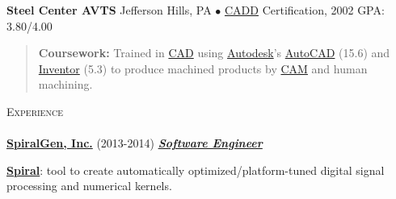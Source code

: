 \documentclass{article}
\newcommand{\area}[2]{\vspace*{-9pt} \begin{verse}\textbf{#1}   #2 \end{verse}  }
\newcommand{\lineunder}{\vspace*{-8pt} \\ \hspace*{-18pt} \hrulefill \\}
\newcommand{\header}[1]{{\hspace*{-15pt}\vspace*{6pt} \textsc{#1}} \vspace*{-6pt} \lineunder}
\newcommand{\employer}[3]{{ \textbf{#1} (#2) \underline{\textbf{\emph{#3}}}\\  }}
\newcommand{\schoolwithcourses}[3]{
 \textbf{#1} #2 $\bullet$ #3\\ 
\vspace*{5pt}
}
\begin{document}
\schoolwithcourses{Steel Center AVTS}{Jefferson Hills, PA}{\href{http://en.wikipedia.org/wiki/Computer-aided_design}{CADD} Certification, 2002 GPA: 3.80/4.00}
\area{
Coursework: }
{Trained in \href{http://en.wikipedia.org/wiki/Computer-aided_design}{CAD} using \href{http://www.autodesk.com/}{Autodesk}'s \href{http://www.autodesk.com/products/autocad/overview}{AutoCAD} (15.6) and \href{http://www.autodesk.com/products/autodesk-inventor-family/overview}{Inventor} (5.3) 
to produce machined products by \href{http://en.wikipedia.org/wiki/Computer-aided_manufacturing}{CAM} and human machining.  }

\header{Experience}

\employer{\href{http://spiralgen.com/}{SpiralGen, Inc.}}{2013-2014}{Software Engineer}

\textbf{\href{http://spiral.net/}{Spiral}}: tool to create automatically optimized/platform-tuned digital signal processing and numerical kernels.
\end{document}
